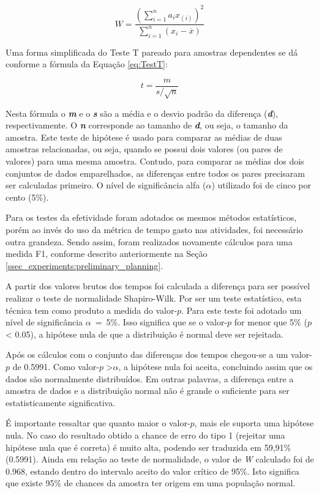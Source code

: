\begin{equation}
\label{eq:Shapiro}
W = \frac{\left(\sum_{i=1}^{n} a_ix_{(i)}\right)^2}{\sum_{i=1}^{n}\left(x_i -\overline{x}\right)} 
\end{equation}

Uma forma simplificada do Teste T pareado para amostras dependentes
se dá conforme a fórmula da Equação \ref{eq:TestT}:

\begin{equation}
\label{eq:TestT}
t = \frac{m}{s/\sqrt{n}} 
\end{equation}

Nesta fórmula o \textit{\textbf{m}} e o \textit{\textbf{s}} são a média e o desvio padrão da diferença (\textbf{\textit{d}}), respectivamente. 
O \textit{\textbf{n}} corresponde ao tamanho de \textit{\textbf{d}}, ou seja, o tamanho da amostra.
Este teste de hipótese é usado para comparar as médias de duas amostras relacionadas, ou seja, quando se possui dois valores (ou pares de valores) para uma mesma amostra. 
Contudo, para comparar as médias dos dois conjuntos de dados emparelhados, as diferenças entre todos os pares precisaram ser calculadas primeiro.
O nível de significância alfa ($\alpha$) utilizado foi de cinco por cento (5\%).

Para os testes da efetividade foram adotados os mesmos métodos estatísticos, porém ao invés do uso da métrica de tempo gasto nas atividades, foi necessário outra grandeza.
Sendo assim, foram realizados novamente cálculos para uma medida F1, conforme descrito anteriormente na Seção \ref{ssec_experiments:preliminary_planning}.


A partir dos valores brutos dos tempos foi calculada a diferença para ser possível realizar o teste de normalidade Shapiro-Wilk.
Por ser um teste estatístico, esta técnica tem como produto a medida do valor-$p$.
Para este teste foi adotado um nível de significância $\alpha$~=~5\%. 
Isso significa que se o valor-$p$ for menor que 5\% ($p$ < 0.05), a hipótese nula de que a distribuição é normal deve ser rejeitada.

Após os cálculos com o conjunto das diferenças dos tempos chegou-se a um valor-$p$ de 0.5991.
Como valor-$p$ \textgreater $\alpha$, a hipótese nula foi aceita, concluindo assim que os dados são normalmente distribuídos.
Em outras palavras, a diferença entre a amostra de dados e a distribuição normal não é grande o suficiente para ser estatisticamente significativa.

É importante ressaltar que quanto maior o valor-$p$, mais ele suporta uma hipótese nula. 
No caso do resultado obtido a chance de erro do tipo 1 (rejeitar uma hipótese nula que é correta) é muito alta, podendo ser traduzida em 59,91\% (0.5991).
Ainda em relação ao teste de normalidade, o valor de \textit{W} calculado foi de 0.968, estando dentro do intervalo aceito do valor crítico de 95\%. 
Isto significa que existe 95\% de chances da amostra ter origem em uma população normal.

